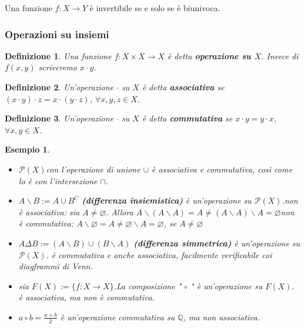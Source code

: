 \documentclass[a4paper,12pt]{article}
\theoremstyle{mystyle}
\newtheorem*{definition}{Definizione}
\newtheorem*{example}{Esempio}
\begin{document}
Una funzione \(f: X \rightarrow Y\) è invertibile se e solo se è biunivoca.

\subsubsection{Operazioni su insiemi}

\begin{definition}
    Una funzione \(f: X \times X \rightarrow X\) è detta \textbf{operazione su \(X\)}. Invece di \(f(x,y)\) scriveremo \(x \cdot y\).
\end{definition}

\begin{definition}
    Un'operazione \(\cdot\) su \(X\) è detta \textbf{associativa} se \((x \cdot y) \cdot z = x \cdot (y \cdot z)\), \(\forall x,y,z \in X\).
\end{definition}

\begin{definition}
    Un'operazione \(\cdot\) su \(X\) è detta \textbf{commutativa} se \(x \cdot y = y \cdot x\), \(\forall x,y \in X\).
\end{definition}

\begin{example}
    \
    \begin{itemize}
        \item \(\mathcal{P}(X) \)con l'operazione di unione \(\cup\) è associativa e commutativa, così come lo è con l'intersezione \( \cap \).
        \item \(A \backslash B  := A \cup B^C\) \textbf{(differenza insiemistica)} è un'operazione su \(\mathcal{P}(X)\).\newline non è associativa: sia \(A \neq \varnothing.\) Allora \(A \backslash (A \backslash A) = A \neq (A\backslash A) \backslash A = \varnothing\)\newline non è commutativa: \(A \backslash \varnothing = A \neq \varnothing \backslash A = \varnothing\), se \(A \neq \varnothing\)
        \item \(A \Delta B := (A \backslash B) \cup (B \backslash A)\) \textbf{(differenza simmetrica)} è un'operazione su \(\mathcal{P}(X)\). \newline è commutativa e anche associativa, facilmente verificabile coi diagframmi di Venn.
        \item sia \(F(X) := \{f : X\rightarrow X\}\).\newline La composizione " \(\circ\) " è un'operazione su \(F(X)\). \newline è associativa, ma non è commutativa.
        \item \(a \circ b = \frac{a + b}{2} \) è un'operazione commutativa su \(\mathbb{Q}\), ma non associativa.
    \end{itemize}
\end{example}
\end{document}
